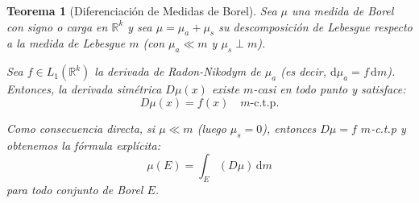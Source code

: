 \documentclass[12pt,a4paper]{article}
\theoremstyle{profesional}
\newtheorem{teorema}{Teorema}[section]
\theoremstyle{definicion-style}
\newcommand{\R}{\mathbb{R}}
\begin{document}
\begin{teorema}[Diferenciación de Medidas de Borel]
    Sea \( \mu \) una medida de Borel con signo o carga en \( \R^k \) y sea \( \mu = \mu_a + \mu_s \) su descomposición de Lebesgue respecto a la medida de Lebesgue \( m \) (con \( \mu_a \ll m \) y \( \mu_s \perp m \)).

    Sea \( f \in L_1(\R^k) \) la derivada de Radon-Nikodym de \( \mu_a \) (es decir, \( \mathrm{d}\mu_a = f \, \mathrm{d}m \)). Entonces, la derivada simétrica \( D\mu(x) \) existe \( m \)-casi en todo punto y satisface:
    \[
        D\mu(x) = f(x) \quad m\text{-c.t.p.}
    \]

    Como consecuencia directa, si \( \mu \ll m \) (luego \( \mu_s = 0 \)), entonces \( D\mu = f \) \( m \)-c.t.p y obtenemos la fórmula explícita:
    \[
        \mu(E) = \int_E (D\mu) \, \mathrm{d}m
    \]
    para todo conjunto de Borel \( E \).
\end{teorema}
\end{document}
